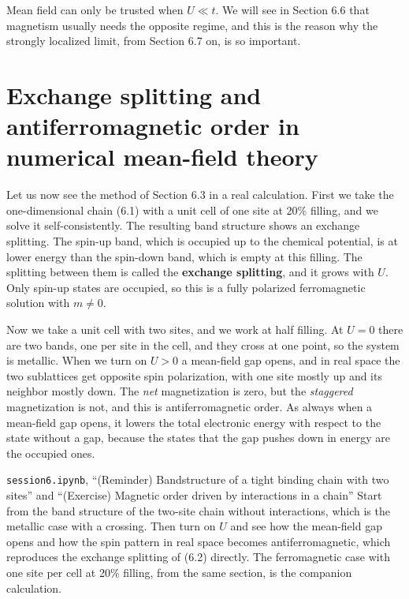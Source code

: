 Mean field can only be trusted when $U \ll t$. We will see in Section 6.6 that magnetism usually needs
the opposite regime, and this is the reason why the strongly localized limit, from Section 6.7 on, is
so important.

\section{Exchange splitting and antiferromagnetic order in numerical mean-field theory}

Let us now see the method of Section 6.3 in a real calculation. First we take the one-dimensional
chain (6.1) with a unit cell of one site at 20\% filling, and we solve it self-consistently. The
resulting band structure shows an exchange splitting. The spin-up band, which is occupied up to the
chemical potential, is at lower energy than the spin-down band, which is empty at this filling. The
splitting between them is called the \textbf{exchange splitting}, and it grows with $U$. Only spin-up
states are occupied, so this is a fully polarized ferromagnetic solution with $m\neq 0$.

Now we take a unit cell with two sites, and we work at half filling. At $U=0$ there are two bands, one
per site in the cell, and they cross at one point, so the system is metallic. When we turn on $U>0$ a
mean-field gap opens, and in real space the two sublattices get opposite spin polarization, with one
site mostly up and its neighbor mostly down. The \emph{net} magnetization is zero, but the
\emph{staggered} magnetization is not, and this is antiferromagnetic order. As always when a
mean-field gap opens, it lowers the total electronic energy with respect to the state without a gap,
because the states that the gap pushes down in energy are the occupied ones.

\begin{notebookbox}{\texttt{session6.ipynb}, ``(Reminder) Bandstructure of a tight binding chain with two sites'' and ``(Exercise) Magnetic order driven by interactions in a chain''}
Start from the band structure of the two-site chain without interactions, which is the metallic case
with a crossing. Then turn on $U$ and see how the mean-field gap opens and how the spin pattern in
real space becomes antiferromagnetic, which reproduces the exchange splitting of (6.2) directly. The
ferromagnetic case with one site per cell at 20\% filling, from the same section, is the companion
calculation.
\end{notebookbox}

